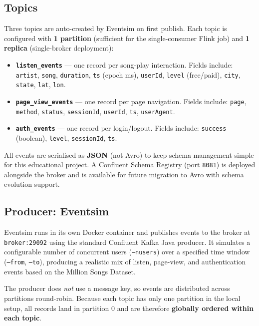 \subsection{Topics}

Three topics are auto-created by Eventsim on first publish.
Each topic is configured with \textbf{1 partition} (sufficient for the single-consumer Flink job)
and \textbf{1 replica} (single-broker deployment):

\begin{itemize}
  \item \textbf{\texttt{listen\_events}} — one record per song-play interaction.
        Fields include: \texttt{artist}, \texttt{song}, \texttt{duration}, \texttt{ts} (epoch ms),
        \texttt{userId}, \texttt{level} (free/paid), \texttt{city}, \texttt{state}, \texttt{lat}, \texttt{lon}.
  \item \textbf{\texttt{page\_view\_events}} — one record per page navigation.
        Fields include: \texttt{page}, \texttt{method}, \texttt{status}, \texttt{sessionId},
        \texttt{userId}, \texttt{ts}, \texttt{userAgent}.
  \item \textbf{\texttt{auth\_events}} — one record per login/logout.
        Fields include: \texttt{success} (boolean), \texttt{level}, \texttt{sessionId}, \texttt{ts}.
\end{itemize}

All events are serialised as \textbf{JSON} (not Avro) to keep schema management simple
for this educational project.
A Confluent Schema Registry (port \texttt{8081}) is deployed alongside the broker
and is available for future migration to Avro with schema evolution support.

\subsection{Producer: Eventsim}

Eventsim runs in its own Docker container and publishes events to the broker at
\texttt{broker:29092} using the standard Confluent Kafka Java producer.
It simulates a configurable number of concurrent users (\texttt{--nusers}) over a specified
time window (\texttt{--from}, \texttt{--to}), producing a realistic mix of listen, page-view,
and authentication events based on the Million Songs Dataset.

The producer does \emph{not} use a message key, so events are distributed across partitions
round-robin.
Because each topic has only one partition in the local setup, all records land in partition 0
and are therefore \textbf{globally ordered within each topic}.

